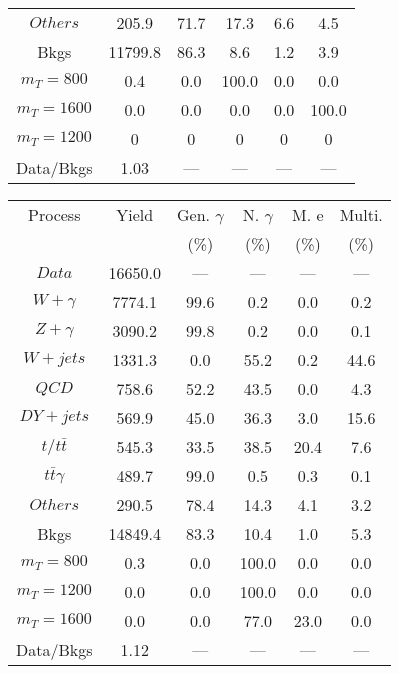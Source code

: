 \begin{figure}
\begin{minipage}[c]{0.32\textwidth}
{\begin{tabular}{cccccc}
$ Others $ &  205.9 &  71.7 &  17.3 &  6.6 &  4.5\\
Bkgs &  11799.8 &  86.3 &  8.6 &  1.2 &  3.9\\
$ m_{T} = 800 $ &  0.4 &  0.0 &  100.0 &  0.0 &  0.0\\
$ m_{T} = 1600 $ &  0.0 &  0.0 &  0.0 &  0.0 &  100.0\\
$ m_{T} = 1200 $ &  0 &  0 &  0 &  0 &  0\\
Data/Bkgs &  1.03 &  --- &  --- &  --- &  ---\\
\hline
\end{tabular}
}
\end{minipage}
\begin{minipage}[c]{0.32\textwidth}
\centering
\tiny{
\begin{tabular}{cccccc}
\hline
Process & Yield & Gen. $\gamma$ & N. $\gamma$ & M. e & Multi. \\
 &  & (\%) & (\%) & (\%) & (\%)  \\
\hline
                                                                      $ Data $ &  16650.0 &  --- &  --- &  --- &  ---\\
$ W+\gamma $ &  7774.1 &  99.6 &  0.2 &  0.0 &  0.2\\
$ Z+\gamma $ &  3090.2 &  99.8 &  0.2 &  0.0 &  0.1\\
$ W+jets $ &  1331.3 &  0.0 &  55.2 &  0.2 &  44.6\\
$ QCD $ &  758.6 &  52.2 &  43.5 &  0.0 &  4.3\\
$ DY+jets $ &  569.9 &  45.0 &  36.3 &  3.0 &  15.6\\
$ t/t\bar{t} $ &  545.3 &  33.5 &  38.5 &  20.4 &  7.6\\
$ t\bar{t}\gamma $ &  489.7 &  99.0 &  0.5 &  0.3 &  0.1\\
$ Others $ &  290.5 &  78.4 &  14.3 &  4.1 &  3.2\\
Bkgs &  14849.4 &  83.3 &  10.4 &  1.0 &  5.3\\
$ m_{T} = 800 $ &  0.3 &  0.0 &  100.0 &  0.0 &  0.0\\
$ m_{T} = 1200 $ &  0.0 &  0.0 &  100.0 &  0.0 &  0.0\\
$ m_{T} = 1600 $ &  0.0 &  0.0 &  77.0 &  23.0 &  0.0\\
Data/Bkgs &  1.12 &  --- &  --- &  --- &  ---\\
\hline
\end{tabular}
}
\end{minipage}
\begin{minipage}[c]{0.32\textwidth}
\centering
\tiny{
}
\end{minipage}
\end{figure}
